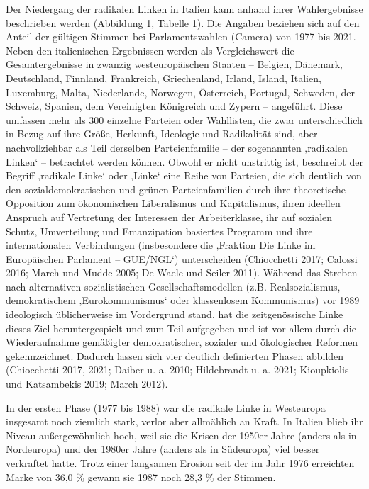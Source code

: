 \begin{multicols*}{2}
Der Niedergang der radikalen Linken in Italien kann anhand ihrer Wahlergebnisse beschrieben werden (Abbildung 1, Tabelle 1). Die Angaben beziehen sich auf den Anteil der gültigen Stimmen bei Parlamentswahlen (Camera) von 1977 bis 2021. Neben den italienischen Ergebnissen werden als Vergleichswert die Gesamtergebnisse in zwanzig westeuropäischen Staaten – Belgien, Dänemark, Deutschland, Finnland, Frankreich, Griechenland, Irland, Island, Italien, Luxemburg, Malta, Niederlande, Norwegen, Österreich, Portugal, Schweden, der Schweiz, Spanien, dem Vereinigten Königreich und Zypern – angeführt. Diese umfassen mehr als 300 einzelne Parteien oder Wahllisten, die zwar unterschiedlich in Bezug auf ihre Größe, Herkunft, Ideologie und Radikalität sind, aber nachvollziehbar als Teil derselben Parteienfamilie – der sogenannten ‚radikalen Linken‘ – betrachtet werden können. Obwohl er nicht unstrittig ist,  beschreibt der Begriff ‚radikale Linke‘ oder ‚Linke‘ eine Reihe von Parteien, die sich deutlich von den sozialdemokratischen und grünen Parteienfamilien durch ihre theoretische Opposition zum ökonomischen Liberalismus und Kapitalismus, ihren ideellen Anspruch auf Vertretung der Interessen der Arbeiterklasse, ihr auf sozialen Schutz, Umverteilung und Emanzipation basiertes Programm und ihre internationalen Verbindungen (insbesondere die ‚Fraktion Die Linke im Europäischen Parlament – GUE/NGL‘) unterscheiden (Chiocchetti 2017; Calossi 2016; March und Mudde 2005; De Waele und Seiler 2011). Während das Streben nach alternativen sozialistischen Gesellschaftsmodellen (z.B. Realsozialismus, demokratischem ‚Eurokommunismus‘ oder klassenlosem Kommunismus) vor 1989 ideologisch üblicherweise im Vordergrund stand, hat die zeitgenössische Linke dieses Ziel heruntergespielt und zum Teil aufgegeben und ist vor allem durch die Wiederaufnahme gemäßigter demokratischer, sozialer und ökologischer Reformen gekennzeichnet. Dadurch lassen sich vier deutlich definierten Phasen abbilden (Chiocchetti 2017, 2021; Daiber u. a. 2010; Hildebrandt u. a. 2021; Kioupkiolis und Katsambekis 2019; March 2012).

In der ersten Phase (1977 bis 1988) war die radikale Linke in Westeuropa insgesamt noch ziemlich stark, verlor aber allmählich an Kraft. In Italien blieb ihr Niveau außergewöhnlich hoch, weil sie die Krisen der 1950er Jahre (anders als in Nordeuropa) und der 1980er Jahre (anders als in Südeuropa) viel besser verkraftet hatte. Trotz einer langsamen Erosion seit der im Jahr 1976 erreichten Marke von 36,0 \% gewann sie 1987 noch 28,3 \% der Stimmen.


\end{multicols*}

